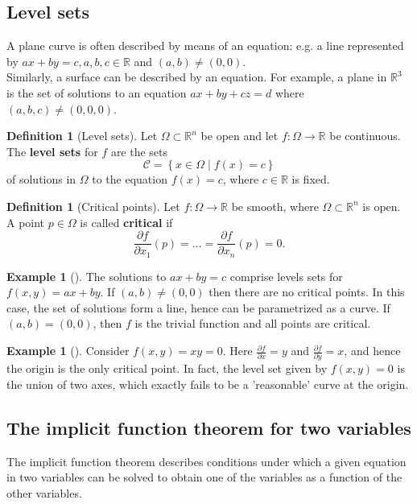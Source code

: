 \documentclass[reqno]{amsart}
\theoremstyle{plain}%
\theoremstyle{definition}
\newtheorem{definition}[theorem]{Definition}
\newtheorem{example}[theorem]{Example}
\theoremstyle{remark}
\begin{document}
\subsection{Level sets}
A plane curve is often described by means of an equation: e.g. a line
represented by $ax+by =c, a,b,c \in \mathbb{R}$ and $(a,b) \neq (0,0)$.\\
Similarly, a surface can be described by an equation. For example, a plane in
$\mathbb{R}^3$ is the set of solutions to an equation
$ax +by +cz = d$ where $\left( a,b,c \right) \neq 
\left( 0,0,0 \right) $.
\begin{definition}[Level sets]
    Let $\Omega \subset \mathbb{R}^{n}$ be open and let 
    $f  \colon \Omega \to \mathbb{R}$ be continuous. The \textbf{level sets}
    for
    $f$ are the sets
    \[
    \mathcal{C} = \left\{ x \in \Omega  \mid  f(x) = c \right\} 
    \] 
    of solutions in $\Omega$ to the equation $f(x) = c$, where
    $c \in \mathbb{R}$ is fixed.
\end{definition}
\begin{definition}[Critical points]
    Let $f  \colon \Omega \to \mathbb{R}$ be smooth, where $\Omega \subset
    \mathbb{R}^{n}$ is open. A point $p \in \Omega$ is called \textbf{critical}
    if
    \[
        \frac{\partial f}{\partial x_1}(p) = \ldots = 
        \frac{\partial f}{\partial x_n}(p) = 0.
    \] 
\end{definition}

\begin{example}[]
    The solutions to $ax + by = c$ comprise levels sets for
    $f(x,y)=ax+by$. If $(a,b) \neq (0,0)$ then there are no critical points. In
    this case, the set of solutions form a line, hence can be parametrized as
    a curve. If $(a,b) = (0,0)$, then $f$ is the trivial function and all
    points are critical.
\end{example}
\begin{example}[]
    Consider $f(x,y) = xy = 0$. Here
    $\frac{\partial f}{\partial x} = y$ and
    $\frac{\partial f}{\partial y}=x$, and hence the origin is the only
    critical point. In fact, the level set given by $f(x,y)=0$ is the union of
    two axes, which exactly fails to be a 'reasonable' curve at the origin.
\end{example}

\subsection{The implicit function theorem for two variables}
The implicit function theorem describes conditions under which a given equation
in two variables can be solved to obtain one of the variables as a function of
the other variables.
\end{document}
